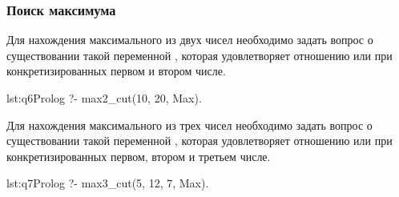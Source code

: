 \subsubsection{Поиск максимума}

Для нахождения максимального из двух чисел 
необходимо задать вопрос о существовании такой переменной , 
которая удовлетворяет отношению  или  при 
конкретизированных первом и втором числе.

\begin{listing}{lst:q6}{Prolog}
?- max2\_cut(10, 20, Max).
\end{listing}

Для нахождения максимального из трех чисел 
необходимо задать вопрос о существовании такой переменной , 
которая удовлетворяет отношению  или  при 
конкретизированных первом, втором и третьем числе.

\begin{listing}{lst:q7}{Prolog}
?- max3\_cut(5, 12, 7, Max).
\end{listing}